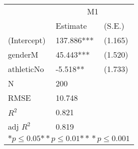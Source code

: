 \begin{tabular}{*{3}{l}}
\hline
                  & \multicolumn{2}{c}{M1}   \tabularnewline
                   &Estimate  &(S.E.)  \tabularnewline
 \hline
 \hline
   (Intercept)     &137.886***   &   (1.165) \tabularnewline
   genderM         &45.443***   &   (1.520) \tabularnewline
   athleticNo      &-5.518**   &   (1.733) \tabularnewline
 \hline
 N                 &200       &        \tabularnewline
 RMSE             &10.748         & \tabularnewline
 $R^2$             &0.821         & \tabularnewline
 adj $R^2$         &0.819         & \tabularnewline
 \hline
\hline
 
 \multicolumn{3}{c}{${*  p}\le 0.05$${*\!\!*  p}\le 0.01$${*\!\!*\!\!*  p}\le 0.001$}\tabularnewline
 \end{tabular}